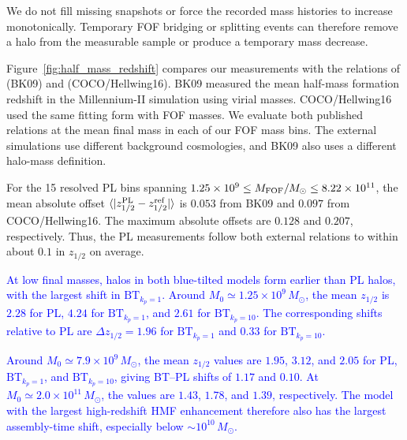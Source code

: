 \documentclass[
 reprint,
 superscriptaddress,
 nofootinbib,
 nobibnotes,
 amsmath,
 amssymb,
 aps,
 prd,
 floatfix,
 longbibliography
]{revtex4-2}
\DeclareRobustCommand{\change}[1]{\textcolor{blue}{#1}}
\DeclareRobustCommand{\BTKPone}{\ensuremath{\mathrm{BT}_{k_p=1}}}
\DeclareRobustCommand{\BTKPten}{\ensuremath{\mathrm{BT}_{k_p=10}}}
\begin{document}
We do not fill missing snapshots or force the recorded mass histories to increase monotonically. Temporary FOF bridging or splitting events can therefore remove a halo from the measurable sample or produce a temporary mass decrease.

Figure~\ref{fig:half_mass_redshift} compares our measurements with the relations of \citet{BoylanKolchin2009MSII} (BK09) and \citet{Hellwing16cocoproject} (COCO/Hellwing16). BK09 measured the mean half-mass formation redshift in the Millennium-II simulation using virial masses. COCO/Hellwing16 used the same fitting form with FOF masses. We evaluate both published relations at the mean final mass in each of our FOF mass bins. The external simulations use different background cosmologies, and BK09 also uses a different halo-mass definition.

For the 15 resolved PL bins spanning \(1.25\times10^9\le M_{\rm FOF}/M_\odot\le8.22\times10^{11}\), the mean absolute offset \(\langle|z_{1/2}^{\rm PL}-z_{1/2}^{\rm ref}|\rangle\) is \(0.053\) from BK09 and \(0.097\) from COCO/Hellwing16. The maximum absolute offsets are \(0.128\) and \(0.207\), respectively. Thus, the PL measurements follow both external relations to within about \(0.1\) in \(z_{1/2}\) on average.

\change{At low final masses, halos in both blue-tilted models form earlier than PL halos, with the largest shift in \BTKPone{}. Around \(M_0\simeq1.25\times10^9\,M_\odot\), the mean \(z_{1/2}\) is \(2.28\) for PL, \(4.24\) for \BTKPone{}, and \(2.61\) for \BTKPten{}. The corresponding shifts relative to PL are \(\Delta z_{1/2}=1.96\) for \BTKPone{} and \(0.33\) for \BTKPten{}.}

\change{Around \(M_0\simeq7.9\times10^9\,M_\odot\), the mean \(z_{1/2}\) values are \(1.95\), \(3.12\), and \(2.05\) for PL, \BTKPone{}, and \BTKPten{}, giving BT--PL shifts of \(1.17\) and \(0.10\). At \(M_0\simeq2.0\times10^{11}\,M_\odot\), the values are \(1.43\), \(1.78\), and \(1.39\), respectively. The model with the largest high-redshift HMF enhancement therefore also has the largest assembly-time shift, especially below \(\sim10^{10}\,M_\odot\).}
\end{document}
